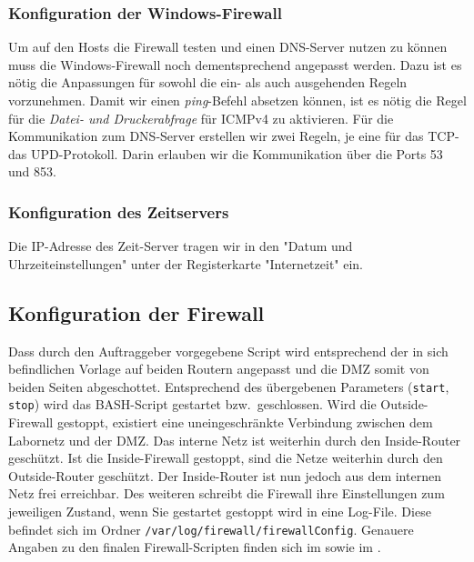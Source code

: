 \subsubsection{Konfiguration der Windows-Firewall}
\label{subsubsec:KonfigurationWinFirewall}
Um auf den Hosts die Firewall testen und einen \ac{DNS}-Server nutzen zu können muss die Windows-Firewall noch dementsprechend angepasst werden.
Dazu ist es nötig die Anpassungen für sowohl die ein- als auch ausgehenden Regeln vorzunehmen. 
Damit wir einen \textit{ping}-Befehl absetzen können, ist es nötig die Regel für die \textit{Datei- und Druckerabfrage} für \ac{ICMP}v4 zu aktivieren.
Für die Kommunikation zum \ac{DNS}-Server erstellen wir zwei Regeln, je eine für das \ac{TCP}- \bzw das \ac{UPD}-Protokoll. Darin erlauben wir die Kommunikation über die Ports 53 und 853.

\subsubsection{Konfiguration des Zeitservers}
\label{subsubsec:KonfigurationWinNTP}
Die \ac{IP}-Adresse des Zeit-Server tragen wir in den "Datum und Uhrzeiteinstellungen" unter der Registerkarte "Internetzeit" ein.

\subsection{Konfiguration der Firewall}
\label{subsec:KonfigurationFirewall}
Dass durch den Auftraggeber vorgegebene Script wird entsprechend der in sich befindlichen Vorlage auf beiden Routern angepasst und die \ac{DMZ} somit von beiden Seiten abgeschottet. Entsprechend des übergebenen Parameters (\verb+start+, \verb+stop+) wird das \ac{BASH}-Script gestartet bzw.\ geschlossen.
Wird die Outside-Firewall gestoppt, existiert eine uneingeschränkte Verbindung zwischen dem Labornetz und der \ac{DMZ}. Das interne Netz ist weiterhin durch den Inside-Router geschützt. Ist die Inside-Firewall gestoppt, sind die Netze weiterhin durch den Outside-Router geschützt. Der Inside-Router ist nun jedoch aus dem internen Netz frei erreichbar.
Des weiteren schreibt die Firewall ihre Einstellungen zum jeweiligen Zustand, wenn Sie gestartet \bzw gestoppt wird in eine Log-File. Diese befindet sich im Ordner \verb+/var/log/firewall/firewallConfig+.
Genauere Angaben zu den finalen Firewall-Scripten finden sich im  sowie im .

